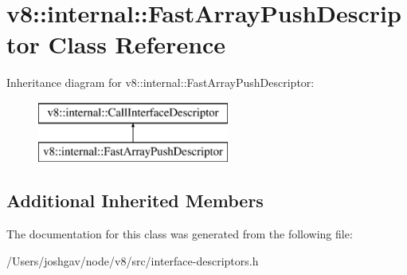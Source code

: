 \hypertarget{classv8_1_1internal_1_1_fast_array_push_descriptor}{}\section{v8\+:\+:internal\+:\+:Fast\+Array\+Push\+Descriptor Class Reference}
\label{classv8_1_1internal_1_1_fast_array_push_descriptor}
Inheritance diagram for v8\+:\+:internal\+:\+:Fast\+Array\+Push\+Descriptor\+:\begin{figure}[H]
\begin{center}
\leavevmode
\includegraphics[height=2.000000cm]{classv8_1_1internal_1_1_fast_array_push_descriptor}
\end{center}
\end{figure}
\subsection*{Additional Inherited Members}


The documentation for this class was generated from the following file\+:\begin{DoxyCompactItemize}
\item 
/\+Users/joshgav/node/v8/src/interface-\/descriptors.\+h\end{DoxyCompactItemize}
